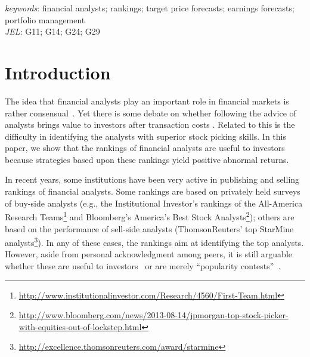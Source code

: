\documentclass[a4paper,twoside,12pt,openright,notitlepage]{report}\usepackage[]{graphicx}\usepackage[]{color}
\newenvironment{knitrout}{}{} %
\begin{document}
\begin{abstract}

\end{abstract}
\textit{keywords}: financial analysts; rankings; target price forecasts; earnings forecasts; portfolio management \\
\textit{JEL}: G11; G14; G24; G29









\begin{knitrout}
\color{fgcolor}



\end{knitrout}

\section{Introduction}
\label{ch1-sec:intro}

The idea that financial analysts play an important role in financial markets is rather consensual~\citep{cowles1933csm,obrien1990}. Yet there is some debate on whether following the advice of analysts brings value to investors after transaction costs \citep{womack1996,mikhail2004sae,li2005persistence}. Related to this is the difficulty in identifying the analysts with superior stock picking skills. In this paper, we show that the rankings of financial analysts are useful to investors because strategies based upon these rankings yield positive abnormal returns.



In recent years, some institutions have been very active in publishing and  selling  rankings of financial analysts. Some rankings  are based on privately held surveys of  buy-side analysts (e.g., the Institutional Investor's rankings of the All-America Research Teams\footnote{\url{http://www.institutionalinvestor.com/Research/4560/First-Team.html}} and Bloomberg's America's Best Stock Analysts\footnote{\sloppy \url{http://www.bloomberg.com/news/2013-08-14/jpmorgan-top-stock-picker-with-equities-out-of-lockstep.html}}); others are based on the performance of sell-side analysts (ThomsonReuters' top StarMine analysts\footnote{\url{http://excellence.thomsonreuters.com/award/starmine}}). In any of these cases, the rankings aim at identifying the top analysts. However, aside from personal acknowledgment among peers, it is still arguable whether these are useful to investors~\citep{desai2000ass} or are merely ``popularity contests''~\citep{emery2009}. %
\end{document}
